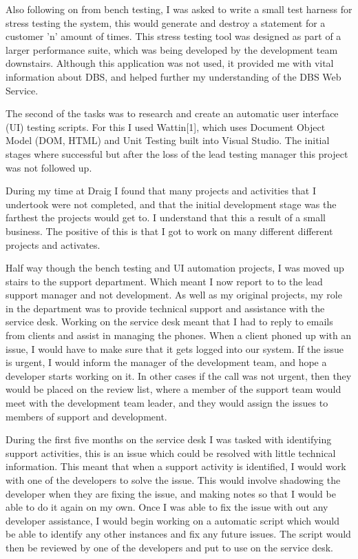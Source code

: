 \documentclass[paper=a4, fontsize=11pt]{scrartcl}	%
\begin{document}
Also following on from bench testing, I was asked to write a small test harness for stress testing the system, this would generate and destroy a statement for a customer 'n' amount of times. This stress testing tool was designed as part of a larger performance suite, which was being developed by the development team downstairs.  Although this application was not used, it provided me with vital information about DBS, and helped further my understanding of the DBS Web Service.

The second of the tasks was to research and create an automatic user interface (UI) testing scripts. For this I used Wattin[1], which uses Document Object Model (DOM, HTML) and Unit Testing built into Visual Studio. The initial stages where successful but after the loss of the lead testing manager this project was not followed up.

During my time at Draig I found that many projects and activities that I undertook were not completed, and that the initial development stage was the farthest the projects would get to. I understand that this a result of a small business. The positive of this is that I got to work on many different different projects and activates. 

Half way though the bench testing and UI automation projects, I was moved up stairs to the support department. Which meant I now report to to the lead support manager and not development. As well as my original projects, my role in the department was to provide technical support and assistance with the service desk. Working on the service desk meant that I had to reply to emails from clients and assist in managing the phones. When a client phoned up with an issue, I would have to make sure that it gets logged into our system. If the issue is urgent, I would inform the manager of the development team, and hope a developer starts working on it. In other cases if the call was not urgent, then they would be placed on the review list, where a member of the support team would meet with the development team leader, and they would assign the issues to members of  support and development.

During the first five months on the service desk I was tasked with identifying support activities, this is an issue which could be resolved with little technical information. This meant that when a support activity is identified, I would work with one of the developers to solve the issue. This would involve shadowing the developer when they are fixing the issue, and making notes so that I would be able to do it again on my own. Once I was able to fix the issue with out any developer assistance, I would begin working on a automatic script which would be able to identify any other instances and fix any future issues. The script would then be reviewed by one of the developers and put to use on the service desk.
\end{document}
